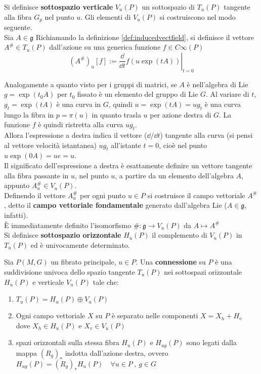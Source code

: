 Si definisce \textbf{sottospazio verticale} $V_u(P)$ un sottospazio di $T_u(P)$
tangente alla fibra $G_p$ nel punto $u$. Gli elementi di $V_u(P)$ si costruiscono
nel modo seguente.\\
Sia $A \in \mathfrak{g}$
Richiamando la definizione \ref{def:inducedvectfield}, si definisce il vettore
$A^\# \in T_u(P)$ dall'azione su una generica funzione $f \in C\infty(P)$
$$
   (A^\#)_u [f] := \left. \frac{\dd}{\dd t} f(u \exp(tA)) \right|_{t=0}
$$

Analogamente a quanto visto per i gruppi di matrici, se $A$ è nell'algebra di Lie
$g = \exp(t_0 A)$ per $t_0$ fissato è un elemento del gruppo di Lie $G$.
Al variare di $t$, $g_t = \exp(tA)$ è una curva in $G$, quindi $u = \exp(tA) = ug_t$
è una curva lungo la fibra in $p = \pi(u)$ in quanto trasla $u$ per azione
destra di $G$. La funzione $f$ è quindi ristretta alla curva $ug_t$. \\
Allora  l'espressione a destra indica il vettore ($\dd / \dd t$) tangente alla curva
(si pensi al vettore velocità istantanea) $ug_t$ all'istante $t=0$, cioè nel punto
$u\exp(0A) = ue = u$.\\
Il significato dell'espressione a destra è esattamente definire
un vettore tangente alla fibra passante in $u$, nel punto $u$, a partire da
un elemento dell'algebra $A$, appunto $A^\#_u \in V_u(P)$.\\

Definendo il vettore $A^\#_u$ per ogni punto $u \in P$ si costruisce il campo
vettoriale $A^\#$, detto il \textbf{campo vettoriale fondamentale} generato
dall'algebra Lie ($A \in \mathfrak{g}$, infatti).\\
È immediatamente definito l'isomorfismo $\# : \mathfrak{g} \to V_u(P)$ da $A \mapsto A^\#$\\

Si definisce \textbf{sottospazio orizzontale} $H_u(P)$ il complemento di $V_u(P)$
in $T_u(P)$ ed è univocamente determinato.

\begin{definition}\label{def:prbundleconnection}
   Sia $P(M,G)$ un fibrato principale, $u \in P$. Una \textbf{connessione} su $P$ è una
   suddivisione univoca dello spazio tangente $T_u(P)$ nei sottospazi orizzontale $H_u(P)$
   e verticale $V_u(P)$ tale che:
   \begin{enumerate}
      \item $T_u(P) = H_u(P) \oplus V_u(P)$
      \item Ogni campo vettoriale $X$ su $P$ è separato nelle componenti $X = X_h + H_v$ \\
      dove $X_h \in H_u(P)$ e $X_v \in V_u(P)$
      \item spazi orizzontali sulla stessa fibra $H_u(P)$ e $H_{ug}(P)$ sono legati
      dalla mappa $(R_g)_*$ indotta dall'azione destra, ovvero
      $ H_{ug}(P) = (R_g)_* H_u(P) \quad \forall u \in P \: , \: g\in G$
   \end{enumerate}
\end{definition}

